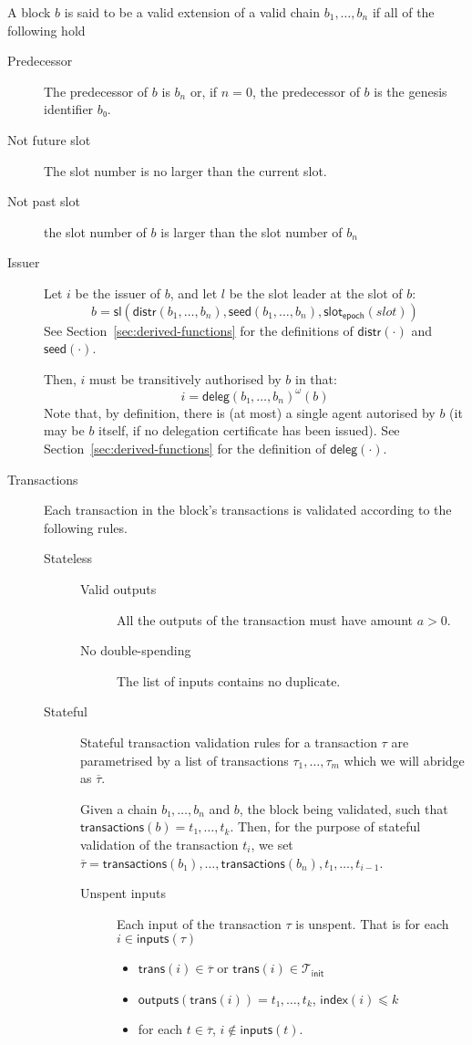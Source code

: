 \documentclass{article}
\newcommand{\improvement}[1]{\todo[linecolor=pink,backgroundcolor=pink!25,bordercolor=pink]{#1}}
\newcommand{\txs}{\mathcal{T}}
\newcommand{\txinit}{\txs_{\!\mathsf{init}}}
\newcommand{\slotleader}[3]{\mathsf{sl}(#1,#2,#3)}
\newcommand{\transactions}[1]{\mathsf{transactions}(#1)}
\newcommand{\inputs}[1]{\mathsf{inputs}(#1)}
\newcommand{\outputs}[1]{\mathsf{outputs}(#1)}
\newcommand{\intrans}[1]{\mathsf{trans}(#1)}
\newcommand{\inindex}[1]{\mathsf{index}(#1)}
\newcommand{\transitivefix}[1]{{#1}^ω}
\newcommand{\delegations}[1]{\mathsf{deleg}(#1)}
\newcommand{\epochslot}[1]{\mathsf{slot}_\mathsf{epoch}(#1)}
\newcommand{\epochseed}[1]{\mathsf{seed}(#1)}
\newcommand{\epochdistribution}[1]{\mathsf{distr}(#1)}
\begin{document}
A block $b$ is said to be a valid extension of a valid chain
$b_1,…,b_n$ if all of the following hold
\begin{description}
\item[Predecessor] The predecessor of $b$ is $b_n$ or, if $n=0$, the
  predecessor of $b$ is the genesis identifier $b₀$.
\item[Not future slot] The slot number is no larger than the current
  slot.
\item[Not past slot] the slot number of $b$ is larger than the slot
  number of $b_n$
\item[Issuer] Let $i$ be the issuer of $b$, and let $l$ be the slot
  leader at the slot of $b$:
  $$
  b = \slotleader{\epochdistribution{b_1,…,b_n}}{\epochseed{b_1,…,b_n}}{\epochslot{slot}}
  $$
  See Section~\ref{sec:derived-functions} for the definitions of
  $\epochdistribution{⋅}$ and $\epochseed{⋅}$.
  \improvement{this doesn't read too well, improve.}

  Then, $i$ must be transitively authorised by $b$ in that:
  $$
  i = \transitivefix{\delegations{b₁,…,b_n}}(b)
  $$
  Note that, by definition, there is (at most) a single agent
  autorised by $b$ (it may be $b$ itself, if no delegation certificate
  has been issued). See Section~\ref{sec:derived-functions} for the
  definition of $\delegations{⋅}$.
\item[Transactions] Each transaction in the block's transactions is
  validated according to the following rules.
  \begin{description}
  \item[Stateless]\hfill
    \begin{description}
    \item[Valid outputs] All the outputs of the transaction must have
      amount $a > 0$.
    \item[No double-spending] The list of inputs contains no duplicate.
    \end{description}
  \item[Stateful] Stateful transaction validation rules for a transaction $τ$
    are parametrised by a list of transactions $τ_1,…,τ_m$ which we will abridge
    as $\overline{τ}$.

    Given a chain $b₁,…,b_n$ and $b$, the block being validated, such
    that $\transactions{b}=t₁,…,t_k$. Then, for the purpose of
    stateful validation of the transaction $t_i$, we set
    $\overline{τ} = \transactions{b₁},…,\transactions{b_n},t₁,…,t_{i-1}$.
    \begin{description}
    \item[Unspent inputs] Each input of the transaction $τ$ is
      unspent. That is for each $i ∈ \inputs{τ}$
      \begin{itemize}
      \item $\intrans{i}∈\overline{τ}$ or $\intrans{i} ∈ \txinit$
      \item $\outputs{\intrans{i}}=t₁,…,t_k$, $\inindex{i} ⩽ k$
      \item for each $t ∈ \overline{τ}$, $i ∉ \inputs{t}$.
      \end{itemize}


\end{description}
\end{description}
\end{description}
\end{document}
